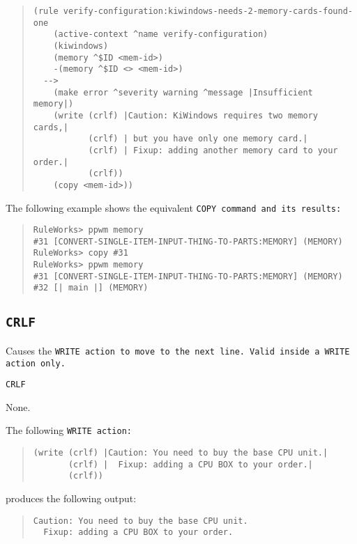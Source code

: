\begin{quote}
\begin{verbatim}
(rule verify-configuration:kiwindows-needs-2-memory-cards-found-one
    (active-context ^name verify-configuration)
    (kiwindows)
    (memory ^$ID <mem-id>)
    -(memory ^$ID <> <mem-id>)
  -->
    (make error ^severity warning ^message |Insufficient memory|)
    (write (crlf) |Caution: KiWindows requires two memory cards,|
           (crlf) | but you have only one memory card.|
           (crlf) | Fixup: adding another memory card to your order.|
           (crlf))
    (copy <mem-id>))
\end{verbatim}
\end{quote}

The following example shows the equivalent \tt{COPY} command and its
results:

\begin{quote}
\begin{verbatim}
RuleWorks> ppwm memory
#31 [CONVERT-SINGLE-ITEM-INPUT-THING-TO-PARTS:MEMORY] (MEMORY)
RuleWorks> copy #31
RuleWorks> ppwm memory
#31 [CONVERT-SINGLE-ITEM-INPUT-THING-TO-PARTS:MEMORY] (MEMORY)
#32 [| main |] (MEMORY)
\end{verbatim}
\end{quote}

\subsection{\tt{CRLF}}

Causes the \tt{WRITE} action to move to the next line. Valid inside a
\tt{WRITE} action only.

\Format

\tt{CRLF}

\Arguments

None.

\Example

The following \tt{WRITE} action:

\begin{quote}
\begin{verbatim}
(write (crlf) |Caution: You need to buy the base CPU unit.|
       (crlf) |  Fixup: adding a CPU BOX to your order.|
       (crlf))
\end{verbatim}
\end{quote}

produces the following output:

\begin{quote}
\begin{verbatim}
Caution: You need to buy the base CPU unit.
  Fixup: adding a CPU BOX to your order.
\end{verbatim}
\end{quote}

